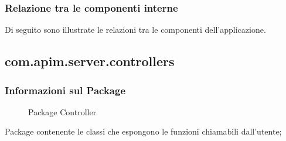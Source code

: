 {{        \subsubsection{Relazione tra le componenti interne}
        Di seguito sono illustrate le relazioni tra le componenti dell'applicazione.
  }
  \subsection{com.apim.server.controllers}{
    \subsubsection{Informazioni sul Package}
        \begin{figure}[ht]
          \centering
          \caption{Package Controller}
          \label{Package Controller}
        \end{figure}
        Package contenente le classi che espongono le funzioni  chiamabili dall'utente;
}}
